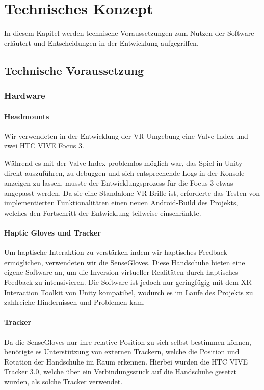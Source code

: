 \chapter{Technisches Konzept}
In diesem Kapitel werden technische Voraussetzungen zum Nutzen der Software erläutert und Entscheidungen in der Entwicklung aufgegriffen.

\section{Technische Voraussetzung}

\subsection{Hardware}
\subsubsection{Headmounts}
Wir verwendeten in der Entwicklung der VR-Umgebung eine Valve Index und zwei HTC VIVE Focus 3.

\noindent Während es mit der Valve Index problemlos möglich war, das Spiel in Unity direkt auszuführen, zu debuggen und sich entsprechende Logs in der Konsole anzeigen zu lassen, musste der Entwicklungsprozess für die Focus 3 etwas angepasst werden. Da sie eine Standalone VR-Brille ist, erforderte das Testen von implementierten Funktionalitäten einen neuen Android-Build des Projekts, welches den Fortschritt der Entwicklung teilweise einschränkte.

\subsubsection{Haptic Gloves und Tracker}
Um haptische Interaktion zu verstärken indem wir haptisches Feedback ermöglichen, verwendeten wir die \dq SenseGloves\dq. Diese Handschuhe bieten eine eigene Software an, um die Inversion virtueller Realitäten durch haptisches Feedback zu intensivieren. Die Software ist jedoch nur geringfügig mit dem XR Interaction Toolkit von Unity kompatibel, wodurch es im Laufe des Projekts zu zahlreiche Hindernissen und Problemen kam.  
\subsubsection{Tracker}
\noindent Da die SenseGloves nur ihre relative Position zu sich selbst bestimmen können, benötigte es Unterstützung von externen Trackern, welche die Position und Rotation der Handschuhe im Raum erkennen. Hierbei wurden die \dq HTC VIVE Tracker 3.0\dq, welche über ein Verbindungsstück auf die Handschuhe gesetzt wurden, als solche Tracker verwendet.

